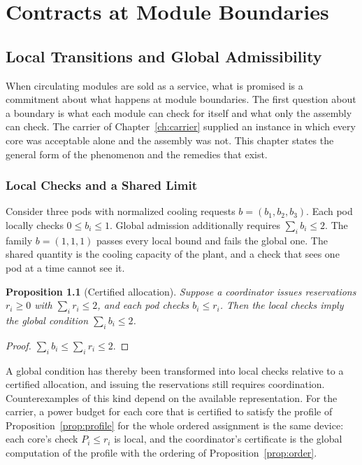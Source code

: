 \documentclass[11pt,openany]{book}
\theoremstyle{plain}
\newtheorem{proposition}[theorem]{Proposition}
\theoremstyle{definition}
\theoremstyle{remark}
\begin{document}
\part{Contracts at Module Boundaries}

\chapter{Local Transitions and Global Admissibility}
\label{ch:global}

When circulating modules are sold as a service, what is promised is a commitment about what happens at module boundaries. The first question about a boundary is what each module can check for itself and what only the assembly can check. The carrier of Chapter~\ref{ch:carrier} supplied an instance in which every core was acceptable alone and the assembly was not. This chapter states the general form of the phenomenon and the remedies that exist.

\section{Local Checks and a Shared Limit}

Consider three pods with normalized cooling requests $b=(b_1,b_2,b_3)$. Each pod locally checks $0\le b_i\le1$. Global admission additionally requires $\sum_ib_i\le2$. The family $b=(1,1,1)$ passes every local bound and fails the global one. The shared quantity is the cooling capacity of the plant, and a check that sees one pod at a time cannot see it.

\begin{proposition}[Certified allocation]
\label{prop:reservation}
Suppose a coordinator issues reservations $r_i\ge0$ with $\sum_ir_i\le2$, and each pod checks $b_i\le r_i$. Then the local checks imply the global condition $\sum_ib_i\le2$.
\end{proposition}
\begin{proof}
$\sum_ib_i\le\sum_ir_i\le2$.
\end{proof}

A global condition has thereby been transformed into local checks relative to a certified allocation, and issuing the reservations still requires coordination. Counterexamples of this kind depend on the available representation. For the carrier, a power budget for each core that is certified to satisfy the profile of Proposition~\ref{prop:profile} for the whole ordered assignment is the same device: each core's check $P_i\le r_i$ is local, and the coordinator's certificate is the global computation of the profile with the ordering of Proposition~\ref{prop:order}.
\end{document}
